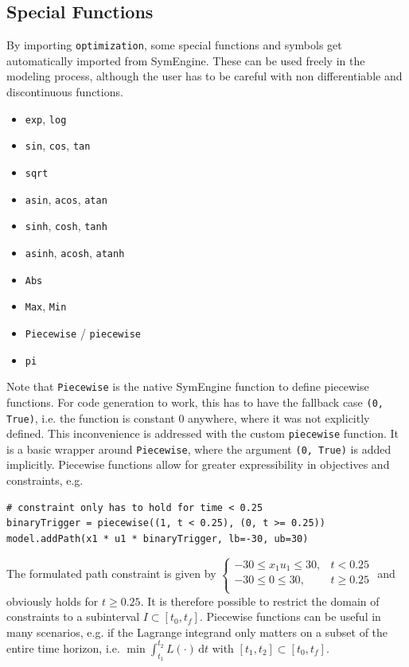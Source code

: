 \documentclass[12pt]{article}
\newcommand{\dd}{\mathrm{d}}
\begin{document}
\subsection{Special Functions}
\label{c:specialFunction}
By importing \texttt{optimization}, some special functions and symbols
get automatically imported from SymEngine. These can be used freely in the
modeling process, although the user has to be careful with non differentiable
and discontinuous functions.
\begin{itemize}
	\item \texttt{exp}, \texttt{log}
	\item \texttt{sin}, \texttt{cos}, \texttt{tan}
	\item \texttt{sqrt}
	\item \texttt{asin}, \texttt{acos}, \texttt{atan}
	\item \texttt{sinh}, \texttt{cosh}, \texttt{tanh}
	\item \texttt{asinh}, \texttt{acosh}, \texttt{atanh}
	\item \texttt{Abs}
	\item \texttt{Max}, \texttt{Min}
	\item \texttt{Piecewise} / \texttt{piecewise}
	\item \texttt{pi}
\end{itemize}

Note that \texttt{Piecewise} is the native SymEngine function to define piecewise functions. For code generation to work, this has to have the fallback case \texttt{(0, True)}, i.e. the function is constant $0$ anywhere, where it was not explicitly defined. This inconvenience is addressed with the custom \texttt{piecewise} function. It is a basic wrapper around \texttt{Piecewise}, where the argument \texttt{(0, True)} is added implicitly. Piecewise functions allow for greater expressibility in objectives and constraints, e.g. 

\begin{lstlisting}
# constraint only has to hold for time < 0.25
binaryTrigger = piecewise((1, t < 0.25), (0, t >= 0.25))
model.addPath(x1 * u1 * binaryTrigger, lb=-30, ub=30) 
\end{lstlisting}

The formulated path constraint is given by
$\begin{cases}
	-30 \leq x_1  u_1 \leq 30,& t < 0.25 \\
	-30 \leq 0 \leq 30,& t \geq 0.25 \\
\end{cases}$
and obviously holds for $t \geq 0.25$. It is therefore possible to restrict the domain of constraints to a subinterval $I \subset [t_0, t_f]$. Piecewise functions can be useful in many scenarios, e.g. if the Lagrange integrand only matters on a subset of the entire time horizon, i.e. $\min \int_{t_1}^{t_2} L(\cdot) \, \dd t$ with $[t_1, t_2] \subset [t_0, t_f]$.
\end{document}
